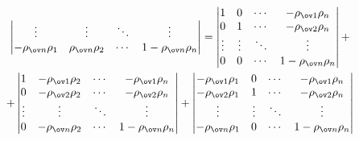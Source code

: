 \begin{pf}
\begin{gather*}
\begin{vmatrix}
\vdots & \vdots & \ddots & \vdots \\ 


-\rho_{\ov n}\rho_1 & \rho_{\ov n}\rho_2 & \dotsb & 


1-\rho_{\ov n}\rho_n 


\end{vmatrix} 


= 


\begin{vmatrix} 


1 & 0 & \dotsb & -\rho_{\ov 1}\rho_n \\ 


0 & 1 & \dotsb & -\rho_{\ov 2}\rho_n \\ 


\vdots & \vdots &\ddots & \vdots \\ 


0 & 0 & \dotsb & 1-\rho_{\ov n}\rho_n 


\end{vmatrix} 


+ \\ 


% 


+ 


\begin{vmatrix} 


1 & -\rho_{\ov 1}\rho_2 & \dotsb & -\rho_{\ov 1}\rho_n \\ 


0 & -\rho_{\ov 2}\rho_2 & \dotsb & -\rho_{\ov 2}\rho_n \\ 


\vdots & \vdots & \ddots & \vdots \\ 


0 & -\rho_{\ov n}\rho_2 & \dotsb & 1-\rho_{\ov n}\rho_n 


\end{vmatrix} 


+ 


\begin{vmatrix} 


-\rho_{\ov 1}\rho_1 & 0 & \dotsb & -\rho_{\ov 1}\rho_n \\ 


-\rho_{\ov 2}\rho_1 & 1 & \dotsb & -\rho_{\ov 2}\rho_n \\ 


\vdots & \vdots & \ddots & \vdots \\


-\rho_{\ov n}\rho_1 & 0 & \dotsb & 1-\rho_{\ov n}\rho_n 


\end{vmatrix} 



\end{gather*}
\end{pf}
